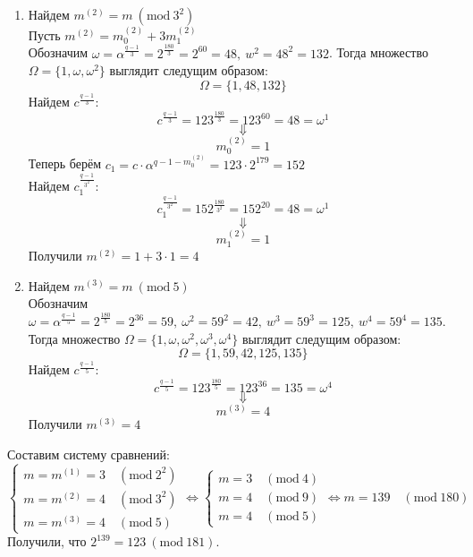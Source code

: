 \begin{solution}
\begin{enumerate}
        \item Найдем \(m^{(2)} = m \ (\text{mod} \  3^2) \) \\
        Пусть \( m^{(2)} = m_0^{(2)} + 3m_1^{(2)} \) \\
        Обозначим \( \omega = \alpha^{\tfrac{q - 1}{3}} = 2^{\tfrac{180}{3}} = 2^{60} = 48, \ w^2 = 48^2 = 132 \). Тогда множество \(\Omega = \{ 1, \omega, \omega^2 \} \) выглядит следущим образом:
        \[
        \Omega = \{ 1, 48, 132 \}
        \]
        Найдем \(c^{\tfrac{q - 1}{3}} \):
        \[
        c^{\tfrac{q - 1}{3}} = 123^{\tfrac{180}{3}} = 123^{60} = 48 = \omega^1
        \]
        \[
        \Downarrow
        \]
        \[
        m_0^{(2)} = 1
        \]
        Теперь берём \( c_1 = c \cdot \alpha^{q - 1 - m_0^{(2)}} = 123 \cdot 2^{179} = 152\) \\
        Найдем \( c_1^{\tfrac{q - 1}{3^2}} \):
        \[
        c_1^{\tfrac{q - 1}{3^2}} = 152^{\tfrac{180}{3^2}} = 152^{20} = 48 = \omega^1
        \]
        \[
        \Downarrow
        \]
        \[
        m_1^{(2)} = 1
        \]
        Получили \(m^{(2)} = 1 + 3 \cdot 1 = 4\)
        \item Найдем \(m^{(3)} = m \ (\text{mod} \  5) \) \\
        Обозначим \( \omega = \alpha^{\tfrac{q - 1}{5}} = 2^{\tfrac{180}{5}} = 2^{36} = 59, \ \omega^2 = 59^2 = 42, \ w^3 = 59^3 = 125, \ w^4 = 59^4 = 135 \). Тогда множество \(\Omega = \{ 1, \omega, \omega^2, \omega^3, \omega^4 \} \) выглядит следущим образом:
        \[
        \Omega = \{ 1, 59, 42, 125, 135 \}
        \]
        Найдем \(c^{\tfrac{q - 1}{5}} \):
        \[
        c^{\tfrac{q - 1}{5}} = 123^{\tfrac{180}{5}} = 123^{36} = 135 = \omega^4
        \]
        \[
        \Downarrow
        \]
        \[
        m^{(3)} = 4
        \]
        Получили \(m^{(3)} = 4\)
    \end{enumerate}
    Составим систему сравнений:
    \[
    \begin{cases}
        m = m^{(1)} = 3 \quad (\text{mod} \ 2^2) \\
        m = m^{(2)} = 4 \quad (\text{mod} \ 3^2) \\
        m = m^{(3)} = 4 \quad (\text{mod} \ 5)
    \end{cases}
    \Longleftrightarrow
    \begin{cases}
        m = 3 \quad (\text{mod} \ 4) \\
        m = 4 \quad (\text{mod} \ 9) \\
        m = 4 \quad (\text{mod} \ 5)
    \end{cases}
    \Longleftrightarrow
    m = 139 \quad (\text{mod} \ 180)
    \]
    Получили, что \( 2^{139} = 123 \ (\text{mod} \ 181) \).
\end{solution}